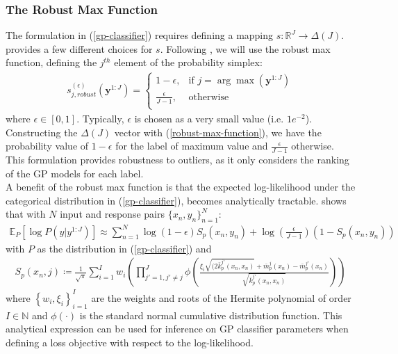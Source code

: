 \documentclass{article}
\numberwithin{equation}{section}
\begin{document}
\subsubsection{The Robust Max Function}
The formulation in (\ref{gp-classifier}) requires defining a mapping $s: \mathbb{R}^J \rightarrow \Delta(J)$. \cite{matthews2017scalable} provides a few different choices for $s$. Following \cite{wild2022generalized}, we will use the robust max function, defining the $j^{th}$ element of the probability simplex:
\begin{align}
s_{j, robust}^{(\epsilon)}\left(\mathbf{y}^{1:J}\right) = \begin{cases}
      1-\epsilon, &  \text{if } j = \arg \max\left(\mathbf{y}^{1:J}\right) \\
      \frac{\epsilon}{J-1}, & \text{otherwise} \\
   \end{cases}
   \label{robust-max-function}
\end{align}
where $\epsilon \in [0, 1]$. Typically, $\epsilon$ is chosen as a very small value (i.e. $1e^{-2}$). Constructing the $\Delta(J)$ vector with (\ref{robust-max-function}), we have the probability value of $1-\epsilon$ for the label of maximum value and $\frac{\epsilon}{J-1}$ otherwise. This formulation provides robustness to outliers, as it only considers the ranking of the GP models for each label.
\\A benefit of the robust max function is that the expected log-likelihood under the categorical distribution in (\ref{gp-classifier}), becomes analytically tractable. \cite{wild2022generalized} shows that with $N$ input and response pairs $\{x_n, y_n\}_{n=1}^N$:
\begin{align}
    \mathbb{E}_{P} \left[\log P\left(y \vert y^{1:J}\right)\right] \approx \sum_{n=1}^N \log(1-\epsilon) S_p(x_n, y_n) + \log\left(\frac{\epsilon}{J-1}\right) \left(1-S_p(x_n, y_n)\right)
    \label{robust-max-function-expected-log-likelihood}
\end{align}
with $P$ as the distribution in (\ref{gp-classifier}) and 
\begin{align}
    S_p(x_n, j) \coloneqq \frac{1}{\sqrt{\pi}}\sum_{i=1}^{I} w_i \left(\prod_{j'=1, j'\neq j}^J \phi\left(\frac{\xi_i\sqrt{(2 \bar{k}^{j'}_p(x_n, x_n)}+\bar{m}^{j}_p(x_n) - \bar{m}^{j'}_p(x_n)}{\sqrt{\bar{k}^{j'}_p(x_n, x_n)}}\right)\right)
\end{align}
where $\left\{w_i, \xi_i\right\}_{i=1}^I$ are the weights and roots of the Hermite polynomial of order $I \in \mathbb{N}$ and  $\phi(\cdot)$ is the standard normal cumulative distribution function. This analytical expression can be used for inference on GP classifier parameters when defining a loss objective with respect to the log-likelihood.
\end{document}

